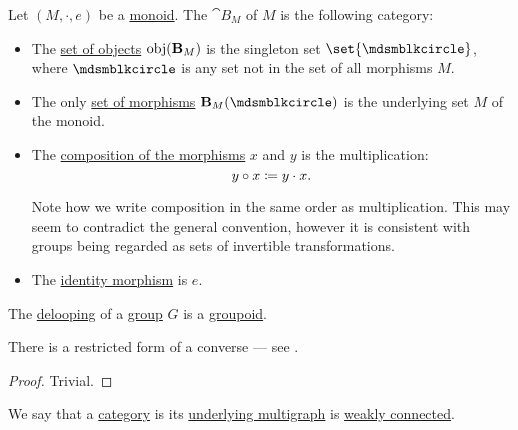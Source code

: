 \begin{definition}\label{def:monoid_delooping}
  Let \( (M, \cdot, e) \) be a \hyperref[def:monoid]{monoid}. The  \( \cat{B}_M \) of \( M \) is the following category:
  \begin{itemize}
    \item The \hyperref[def:category/objects]{set of objects} \( \operatorname{obj}(\operatorname{\mathbf{B}}_M) \) is the singleton set \( \set{ \Anon } \), where \( \Anon \) is any set not in the set of all morphisms \( M \).

    \item The only \hyperref[def:category/morphisms]{set of morphisms} \( \cat{B}_M(\Anon) \) is the underlying set \( M \) of the monoid.

    \item The \hyperref[def:category/composition]{composition of the morphisms} \( x \) and \( y \) is the multiplication:
    \begin{equation*}
      y \bincirc x \coloneqq y \cdot x.
    \end{equation*}

    Note how we write composition in the same order as multiplication. This may seem to contradict the general convention, however it is consistent with groups being regarded as sets of invertible transformations.

    \item The \hyperref[def:category/identity]{identity morphism} is \( e \).
  \end{itemize}
\end{definition}

\begin{proposition}\label{thm:delooping_of_group}
  The \hyperref[def:monoid_delooping]{delooping} of a \hyperref[def:group]{group} \( G \) is a \hyperref[def:groupoid]{groupoid}.
\end{proposition}
\begin{comments}
  \item There is a restricted form of a converse --- see .
\end{comments}
\begin{proof}
  Trivial.
\end{proof}

\begin{definition}\label{def:connected_category}
  We say that a \hyperref[def:category]{category} is  its \hyperref[def:category]{underlying multigraph} is \hyperref[def:graph_connectedness/weak]{weakly connected}.
\end{definition}

